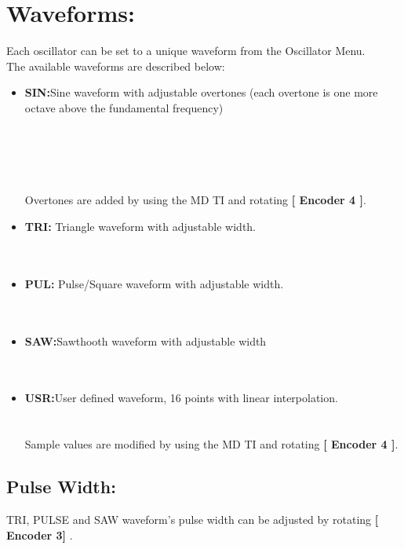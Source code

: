 \section{Waveforms:}
Each oscillator can be set to a unique waveform from the Oscillator Menu.
\\
The available waveforms are described below:

\begin{itemize}
\item{\textbf{SIN:}}Sine waveform with adjustable overtones (each overtone is one more octave above the fundamental frequency)\\
\\\\
\\\\
\\Overtones are added by using the MD TI and rotating \textbf{[ Encoder 4 ]}.
\item{\textbf{TRI:}} Triangle waveform with adjustable width.\\
\\\\
\item{\textbf{PUL:}} Pulse/Square waveform with adjustable width.\\
\\\\
\item{\textbf{SAW:}}Sawthooth waveform with adjustable width\\
\\\\
\item{\textbf{USR:}}User defined waveform, 16 points with linear interpolation.\\
\\\\
Sample values are modified by using the MD TI and rotating \textbf{[ Encoder 4 ]}.
\end{itemize}
\subsection{Pulse Width:}
TRI, PULSE and SAW waveform's pulse width can be adjusted by rotating \textbf{[ Encoder 3] }.\\
\\
\newpage
